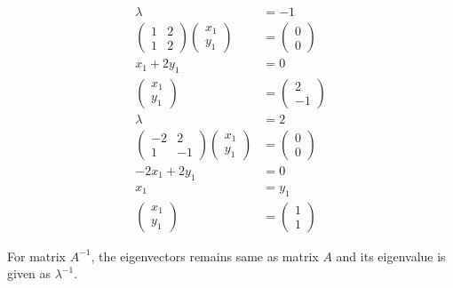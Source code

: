 \documentclass[main.tex]{subfiles}
\begin{document}
\begin{enumerate}
    $$
    \begin{aligned}
    \lambda & = -1\\
    \left(\begin{array}{ll}
    1 & 2 \\
    1 & 2
    \end{array}\right)\left(\begin{array}{l}
    x_{1} \\
    y_{1}
    \end{array}\right) &=\left(\begin{array}{l}
    0 \\
    0
    \end{array}\right) \\
    x_{1}+2 y_{1} &=0 \\
    \left(\begin{array}{l}
    x_{1} \\
    y_{1}
    \end{array}\right) &=\left(\begin{array}{l}
    2 \\
    -1
    \end{array}\right)\\
    \lambda &= 2\\    
    \left(\begin{array}{cc}
    -2 & 2 \\
    1 & -1
    \end{array}\right)\left(\begin{array}{l}
    x_{1} \\
    y_{1}
    \end{array}\right) &=\left(\begin{array}{l}
    0 \\
    0
    \end{array}\right) \\
    -2 x_{1}+2 y_{1} &=0 \\
    x_{1} &=y_{1} \\
    \left(\begin{array}{l}
    x_{1} \\
    y_{1}
    \end{array}\right) &=\left(\begin{array}{l}
    1 \\
    1
    \end{array}\right)
    \end{aligned}
    $$

    For matrix $A^{-1}$, the eigenvectors remains same as matrix $A$ and its eigenvalue is given as $\lambda^{-1}$.


\end{enumerate}
\end{document}
